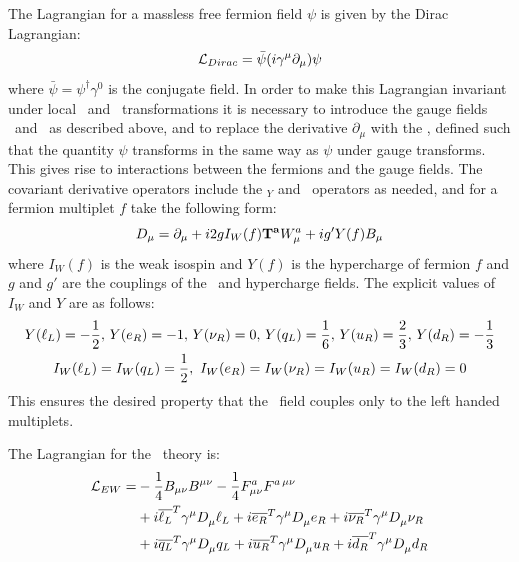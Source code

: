 The Lagrangian for a massless free fermion field $\psi$ is given by the Dirac
Lagrangian:
\begin{equation}
\Lagr_{Dirac} = \bar{\psi} ( i \gamma^\mu \partial_{\mu} ) \psi
\end{equation}
where $\bar{\psi} = \psi^{\dagger}\gamma^{0}$ is the conjugate field. In order to
make this Lagrangian invariant under local \uone\ and \sutwo\ transformations it is
necessary to introduce the gauge fields \Bmu\ and \Wmu\ as described above, and
to replace the derivative $\partial_{\mu}$ with the 
\Dmu,
defined such that the quantity \Dmu$\psi$ transforms in the same way as $\psi$
under gauge transforms. This gives rise to interactions between the
fermions and the gauge fields. The covariant derivative operators include the
\uone$_{Y}$ and \sutwo\ operators as needed, and for a fermion multiplet $f$
take the following form:
\begin{equation}
D_{\mu}  =  \partial_{\mu} + i2gI_{W}(f)\mathbf{T^{a}} W_{\mu}^{a} + ig'Y(f)B_{\mu}
\label{eqn:ew-covariant-derivative}
\end{equation}
where $I_{W}(f)$ is the weak isospin and $Y(f)$ is the
hypercharge of fermion $f$ and $g$ and $g'$ are the couplings of the \sutwo\ and
hypercharge fields. The explicit values of $I_{W}$ and $Y$ are as
follows:
\begin{gather}
Y(\ell_{L}) = - \frac{1}{2},\, Y(e_{R}) = - 1,\, Y(\nu_{R}) =0,\, Y(q_{L}) = \frac{1}{6},\,
Y(u_{R}) = \frac{2}{3},\, Y(d_{R}) = - \frac{1}{3} \notag\\
I_{W}(\ell_{L}) = I_{W}(q_{L}) = \frac{1}{2}, \  I_{W}(e_{R}) = I_{W}(\nu_{R}) =  I_{W}(u_{R}) = I_{W}(d_{R}) = 0 
\label{eqn:hypercharges}
\end{gather}
This ensures the desired property that the \sutwo\ field
couples only to the left handed multiplets. 

The Lagrangian for the \ew\ theory is:
\begin{align}
\mathcal{L}_{EW}  = & - \frac{1}{4} B_{\mu\nu} B^{\mu\nu} - \frac{1}{4} F^{a}_{\mu\nu}
F^{a\,\mu\nu} \notag \\
& +  i \overline{\ell_{L}}^{T} \gamma^{\mu} D_{\mu}^{} \ell_{L} + i  \overline{e_{R}}^{T} \gamma^{\mu}
D_{\mu}^{} e_{R} + i \overline{\nu_{R}}^{T} \gamma^{\mu} D_{\mu}^{} \nu_{R} \notag \\
& +  i \overline{q_{L}}^{T} \gamma^{\mu} D_{\mu}^{} q_{L} + i  \overline{u_R}^{T} \gamma^{\mu}
D_{\mu}^{} u_R + i \overline{d_R}^{T} \gamma^{\mu} D_{\mu}^{} d_{R} 
\label{eqn:ew-lagrangian}
\end{align}

